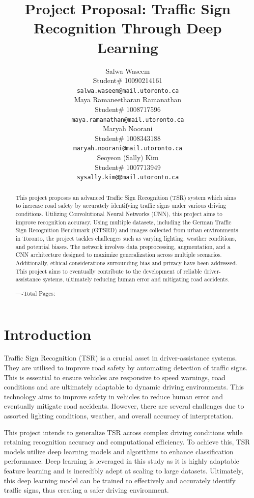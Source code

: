 \documentclass{article} %
\title{Project Proposal: Traffic Sign Recognition Through Deep Learning}
\author{Salwa Waseem  \\
Student\# 10090214161\\
\texttt{salwa.waseem@mail.utoronto.ca} \\
\And
Maya Ramaneetharan Ramanathan  \\
Student\# 1008717596 \\
\texttt{maya.ramanathan@mail.utoronto.ca} \\
\AND
Maryah Noorani  \\
Student\# 1008343188 \\
\texttt{maryah.noorani@mail.utoronto.ca} \\
\And
Seoyeon (Sally) Kim \\
Student\# 1007713949 \\
\texttt{sysally.kim@@mail.utoronto.ca} \\
\AND
}
\begin{document}
\maketitle

\begin{abstract}

This project proposes an advanced Traffic Sign Recognition (TSR) system which aims to increase road safety by accurately identifying traffic signs under various driving conditions. Utilizing Convolutional Neural Networks (CNN), this project aims to improve recognition accuracy. Using multiple datasets, including the German Traffic Sign Recognition Benchmark (GTSRD) and images collected from urban environments in Toronto, the project tackles challenges such as varying lighting, weather conditions, and potential biases. The network involves data preprocessing, augmentation, and a CNN architecture designed to maximize generalization across multiple scenarios. Additionally, ethical considerations surrounding bias and privacy have been addressed. This project aims to eventually contribute to the development of reliable driver-assistance systems, ultimately reducing human error and mitigating road accidents.


----Total Pages: \pageref{last_page}
\end{abstract}



\section{Introduction }

Traffic Sign Recognition (TSR) is a crucial asset in driver-assistance systems. They are utilised to improve road safety by automating detection of traffic signs. This is essential to ensure vehicles are responsive to speed warnings, road conditions and are ultimately adaptable to dynamic driving environments. This technology aims to improve safety in vehicles to reduce human error and eventually mitigate road accidents. However, there are several challenges due to assorted lighting conditions, weather, and overall accuracy of interpretation. 

This project intends to generalize TSR across complex driving conditions while retaining recognition accuracy and computational efficiency. To achieve this, TSR models utilize deep learning models and algorithms to enhance classification performance. Deep learning is leveraged in this study as it is highly adaptable feature learning and is incredibly adept at scaling to large datasets. Ultimately, this deep learning model can be trained to effectively and accurately identify traffic signs, thus creating a safer driving environment. 
\end{document}
